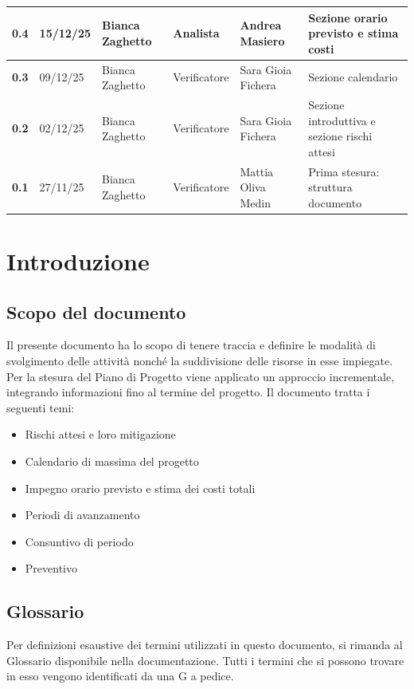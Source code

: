 \documentclass[a4paper,12pt]{article}
\begin{document}
\begin{xltabular}{\textwidth}{|l|l|X|l|X|X|}
\hline
\textbf{0.4} & 15/12/25 & Bianca Zaghetto & Analista & Andrea Masiero & Sezione orario previsto e stima costi \\
\hline
\textbf{0.3} & 09/12/25 & Bianca Zaghetto & Verificatore & Sara Gioia Fichera & Sezione calendario \\
\hline
\textbf{0.2} & 02/12/25 & Bianca Zaghetto & Verificatore & Sara Gioia Fichera & Sezione introduttiva e sezione rischi attesi \\
\hline
\textbf{0.1} & 27/11/25 & Bianca Zaghetto & Verificatore & Mattia Oliva Medin & Prima stesura: struttura documento \\
\hline
\end{xltabular}

\newpage
\tableofcontents

\newpage
\listoffigures

\newpage
\listoftables

\newpage

\section{Introduzione}
    \subsection{Scopo del documento}
        Il presente documento ha lo scopo di tenere traccia e definire le modalità di svolgimento delle attività nonché la suddivisione delle risorse in esse impiegate.
        Per la stesura del Piano di Progetto viene applicato un approccio incrementale, integrando informazioni fino al termine del progetto. Il documento tratta i seguenti temi:
        \begin{itemize}
            \item Rischi attesi e loro mitigazione
            \item Calendario di massima del progetto
            \item Impegno orario previsto e stima dei costi totali
            \item Periodi di avanzamento
            \item Consuntivo di periodo
            \item Preventivo
        \end{itemize}
    \subsection{Glossario}
        Per definizioni esaustive dei termini utilizzati in questo documento, si rimanda al Glossario disponibile nella documentazione. Tutti i termini che si possono trovare in esso vengono identificati da una G a pedice.
\end{document}
